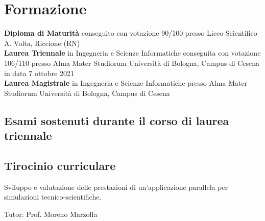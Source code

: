 \documentclass[curriculum-vitae]{subfiles}
\begin{document}
	\section*{Formazione}
		 \textbf{Diploma di Maturità} conseguito con votazione 90/100 presso Liceo Scientifico A. Volta, Riccione (RN)\\
		
		 \textbf{Laurea Triennale} in Ingegneria e Scienze Informatiche conseguita con votazione 106/110 presso Alma Mater Studiorum Università di Bologna, Campus di Cesena in data 7 ottobre 2021\\
		
		 \textbf{Laurea Magistrale} in Ingegneria e Scienze Informatiche presso Alma Mater Studiorum Università di Bologna, Campus di Cesena
		
		\subsection*{Esami sostenuti durante il corso di laurea triennale}
			\begin{minipage}[t]{.47\textwidth}
			\end{minipage}
			\hfill
			\begin{minipage}[t]{.47\textwidth}
			\end{minipage}
		
		\subsection*{Tirocinio curriculare}
			Sviluppo e valutazione delle prestazioni di un'applicazione parallela per simulazioni tecnico-scientifiche.
			
			Tutor: Prof. Moreno Marzolla
			
\end{document}

